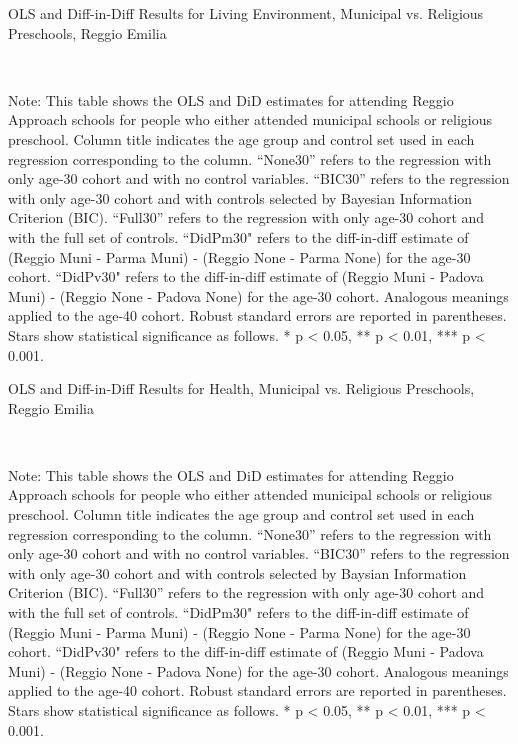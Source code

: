 \begin{landscape}
\begin{table}[H] \caption{OLS and Diff-in-Diff Results for Living Environment, Municipal vs. Religious Preschools, Reggio Emilia} \label{ols-L-reg}
\scalebox{0.85}{
}
\vspace{1ex} \\
\footnotesize\raggedright{Note: This table shows the OLS and DiD estimates for attending Reggio Approach schools for people who either attended municipal schools or religious preschool. Column title indicates the age group and control set used in each regression corresponding to the column. ``None30'' refers to the regression with only age-30 cohort and with no control variables. ``BIC30'' refers to the regression with only age-30 cohort and with controls selected by Bayesian Information Criterion (BIC). ``Full30'' refers to the regression with only age-30 cohort and with the full set of controls. ``DidPm30" refers to the diff-in-diff estimate of (Reggio Muni - Parma Muni) - (Reggio None - Parma None) for the age-30 cohort. ``DidPv30" refers to the diff-in-diff estimate of (Reggio Muni - Padova Muni) - (Reggio None - Padova None) for the age-30 cohort. Analogous meanings applied to the age-40 cohort. Robust standard errors are reported in parentheses. Stars show statistical significance as follows. * p < 0.05, ** p < 0.01, *** p < 0.001.}
\end{table}


\begin{table}[H] \caption{OLS and Diff-in-Diff Results for Health, Municipal vs. Religious Preschools, Reggio Emilia} \label{ols-H-reg}
\scalebox{0.85}{
}
\vspace{1ex} \\
\footnotesize\raggedright{Note: This table shows the OLS and DiD estimates for attending Reggio Approach schools for people who either attended municipal schools or religious preschool. Column title indicates the age group and control set used in each regression corresponding to the column. ``None30'' refers to the regression with only age-30 cohort and with no control variables. ``BIC30'' refers to the regression with only age-30 cohort and with controls selected by Baysian Information Criterion (BIC). ``Full30'' refers to the regression with only age-30 cohort and with the full set of controls. ``DidPm30" refers to the diff-in-diff estimate of (Reggio Muni - Parma Muni) - (Reggio None - Parma None) for the age-30 cohort. ``DidPv30" refers to the diff-in-diff estimate of (Reggio Muni - Padova Muni) - (Reggio None - Padova None) for the age-30 cohort. Analogous meanings applied to the age-40 cohort. Robust standard errors are reported in parentheses. Stars show statistical significance as follows. * p < 0.05, ** p < 0.01, *** p < 0.001.}
\end{table}


\end{landscape}
